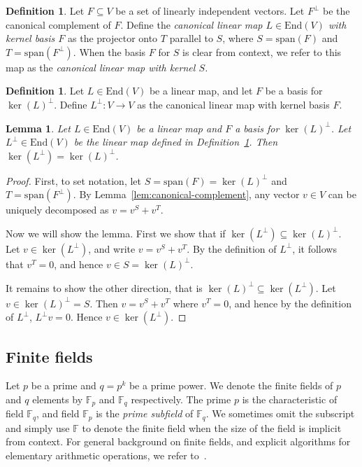 \documentclass[11pt]{article}
\newtheorem{lemma}[theorem]{Lemma}
\theoremstyle{definition}
\newtheorem{definition}[theorem]{Definition}
\newcommand{\F}{\ensuremath{\mathbb{F}}}
\newcommand{\Fp}{\F_p}
\newcommand{\Fq}{\F_q}
\newcommand{\End}{\mathrm{End}}
\begin{document}
\begin{definition}
  \label{def:cl-canonical}
  Let $F \subseteq V$ be a set of linearly independent vectors.
  Let $F^\perp$ be the canonical complement of $F$.
  Define the \emph{canonical linear map $L \in \End(V)$ with kernel basis $F$}
  as the projector onto $T$ parallel to $S$, where $S = \mathrm{span}(F)$ and $T
  = \mathrm{span}(F^\perp)$.
  When the basis $F$ for $S$ is clear from context, we refer to this map as the
  \emph{canonical linear map with kernel $S$.}
\end{definition}

\begin{definition}
  \label{def:Lperp}
  Let $L \in \End(V)$ be a linear map, and let $F$ be a basis for
  $\ker(L)^\perp$.
  Define $L^\perp : V \rightarrow V$ as the canonical linear map with kernel
  basis $F$.
\end{definition}

\begin{lemma}
  \label{lem:L_perp_perp}
  Let $L \in \End(V)$ be a linear map and $F$ a basis for $\ker(L)^\perp$.
  Let $L^\perp \in \End(V)$ be the linear map defined in
  Definition~\ref{def:Lperp}.
  Then $\ker(L^\perp) = \ker(L)^\perp$.
\end{lemma}

\begin{proof}
  First, to set notation, let $S = \mathrm{span}(F) = \ker(L)^\perp$ and $T =
  \mathrm{span}(F^\perp)$. By Lemma~\ref{lem:canonical-complement},
  any vector $v \in V$ can be uniquely decomposed as $v = v^S +
  v^T$. 

  Now we will show the lemma.  First we show that if $\ker(L^\perp) \subseteq \ker(L)^\perp$. Let
  $v \in \ker(L^\perp)$, and write $v = v^S + v^T$.  By the definition
  of $L^\perp$, it follows that $v^T = 0$, and hence $v \in S = \ker(L)^\perp$.

  It remains to show the other direction, that is $\ker(L)^\perp \subseteq
  \ker(L^\perp)$. Let $v \in \ker(L)^\perp = S$. Then $v = v^S + v^T$
  where $v^T = 0$, and hence by the definition of $L^\perp$, $L^\perp
  v = 0$. Hence $v \in \ker(L^\perp)$.

  
\end{proof}

\subsection{Finite fields}
\label{sec:finite-fields}

Let $p$ be a prime and $q = p^k$ be a prime power.
We denote the finite fields of $p$ and $q$ elements by $\Fp$ and $\Fq$
respectively.
The prime $p$ is the characteristic of field $\Fq$, and field $\Fp$ is the
\emph{prime subfield} of $\Fq$.
We sometimes omit the subscript and simply use $\F$ to denote the finite field
when the size of the field is implicit from context.
For general background on finite fields, and explicit algorithms for elementary
arithmetic operations, we refer to~\cite{mullen2013handbook}.
\end{document}
